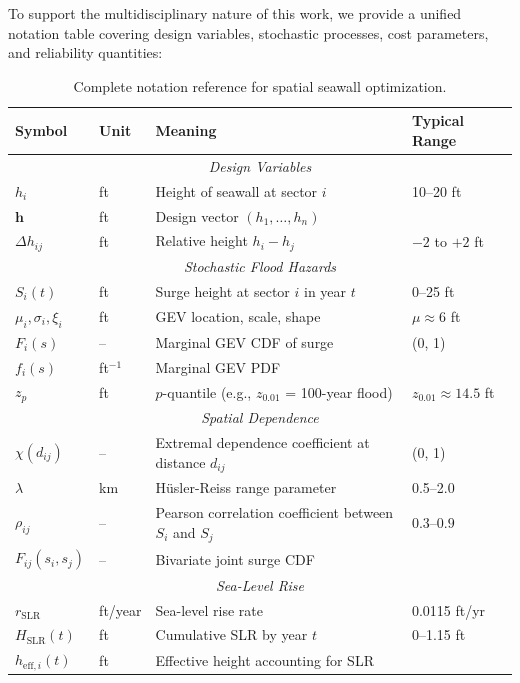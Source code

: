 \documentclass[review]{elsarticle}
\begin{document}
To support the multidisciplinary nature of this work, we provide a unified notation table covering design variables, stochastic processes, cost parameters, and reliability quantities:

\begin{table}[ht]
\caption{Complete notation reference for spatial seawall optimization.}
\label{tab:notation}
\centering
\small
\begin{tabular}{llll}
\toprule
\textbf{Symbol} & \textbf{Unit} & \textbf{Meaning} & \textbf{Typical Range} \\
\midrule
\multicolumn{4}{c}{\textit{Design Variables}} \\
$h_i$ & ft & Height of seawall at sector $i$ & 10--20 ft \\
$\mathbf{h}$ & ft & Design vector $(h_1, \ldots, h_n)$ & \\
$\Delta h_{ij}$ & ft & Relative height $h_i - h_j$ & $-2$ to $+2$ ft \\
\midrule
\multicolumn{4}{c}{\textit{Stochastic Flood Hazards}} \\
$S_i(t)$ & ft & Surge height at sector $i$ in year $t$ & 0--25 ft \\
$\mu_i, \sigma_i, \xi_i$ & ft & GEV location, scale, shape & $\mu \approx 6$ ft \\
$F_i(s)$ & -- & Marginal GEV CDF of surge & (0, 1) \\
$f_i(s)$ & ft$^{-1}$ & Marginal GEV PDF & \\
$z_p$ & ft & $p$-quantile (e.g., $z_{0.01}$ = 100-year flood) & $z_{0.01} \approx 14.5$ ft \\
\midrule
\multicolumn{4}{c}{\textit{Spatial Dependence}} \\
$\chi(d_{ij})$ & -- & Extremal dependence coefficient at distance $d_{ij}$ & (0, 1) \\
$\lambda$ & km & Hüsler-Reiss range parameter & 0.5--2.0 \\
$\rho_{ij}$ & -- & Pearson correlation coefficient between $S_i$ and $S_j$ & $0.3$--$0.9$ \\
$F_{ij}(s_i, s_j)$ & -- & Bivariate joint surge CDF & \\
\midrule
\multicolumn{4}{c}{\textit{Sea-Level Rise}} \\
$r_{\text{SLR}}$ & ft/year & Sea-level rise rate & 0.0115 ft/yr \\
$H_{\text{SLR}}(t)$ & ft & Cumulative SLR by year $t$ & 0--1.15 ft \\
$h_{\text{eff},i}(t)$ & ft & Effective height accounting for SLR & \\

\end{tabular}
\end{table}
\end{document}
